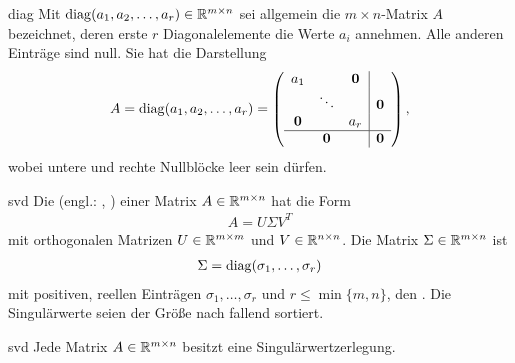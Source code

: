 \begin{Notation}{diag}
  Mit $\operatorname{diag}(a_1,a_2,\dots,a_r) \in \mathbb R^{m\times n}$ sei allgemein die $m\times n$-Matrix $A$ bezeichnet, deren erste $r$ Diagonalelemente die Werte $a_i$ annehmen. Alle anderen Einträge sind null. Sie hat die Darstellung
  \begin{gather}
    A = \operatorname{diag}(a_1,a_2,\dots,a_r)
    = \left(
      \begin{array}{ccc|c}
        a_1&& \mathbf 0&\\
        &\ddots&& \mathbf 0\\
        \mathbf 0&&a_r&\\\hline
        & \mathbf 0 && \mathbf 0
      \end{array}
      \right),
    \end{gather}
    wobei untere und rechte Nullblöcke leer sein dürfen.
\end{Notation}

\begin{Definition}{svd}
  Die  (engl.: , ) einer Matrix
  $A\in \mathbb R^{m\times n}$ hat die Form
  \begin{gather}
    \label{eq:svd:1}
    A = U \Sigma V^T
  \end{gather}
  mit orthogonalen Matrizen $U\in \mathbb R^{m\times m}$ und
  $V\in \mathbb R^{n\times n}$. Die Matrix $\Sigma\in\mathbb R^{m\times n}$ ist
  \begin{gather}
    \Sigma = \operatorname{diag}(\sigma_1,\dots,\sigma_r)
  \end{gather}
  mit positiven, reellen Einträgen $\sigma_1,\dots,\sigma_r$
  und $r\le \min\{m,n\}$, den .
  Die Singulärwerte seien der Größe nach fallend sortiert.
\end{Definition}


\begin{Satz}{svd}
  Jede Matrix $A\in \mathbb R^{m\times n}$ besitzt eine Singulärwertzerlegung.
\end{Satz}

